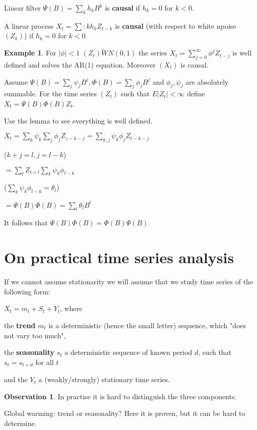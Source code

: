 \documentclass[12pt,a4paper]{amsart}
\theoremstyle{definition} %
\newtheorem{example}[defn]{Example}
\newtheorem{observation}[defn]{Observation}
\theoremstyle{plain} %
\begin{document}
Linear filter $\Psi(B) = \sum_k h_k B^k$ is {\bf causal} if $h_k = 0$ for $k < 0$. 

A linear process $X_t = \sum:k h_k Z_{t-k}$ is {\bf causal} (with respect to white npoise $(Z_k)$) if $h_k = 0$ for $k < 0$. 

\begin{example}
For $|\phi| < 1$ $(Z_t) \tilde WN(0,1)$ the series $X_t = \sum_{j=0}^\infty \phi^j Z_{t-j}$ is well defined and solves the AR(1) equation. Moreover $(X_t)$ is causal. 
\end{example}

Assume 
$\Psi(B) = \sum_j \psi_j B^j, \Phi(B) = \sum_j \phi_j B^j$ and $\phi_j, \psi_j$ are absolutely summable. For the time series $(Z_t)$ such that $E|Z_t| < \infty$ define $X_t = \Psi(B) \Phi(B) Z_t$.

Use the lemma 
to see everything is well defined. 

$X_t = \sum_k \psi_k \sum_j \phi_j Z_{z-k-j} = \sum_{k,j} \psi_k \phi_j Z_{t-k-j}$

($k+j = l, j = l-k$)

$= \sum_l Z_{t+l} \sum_k \psi_k \phi_{l-k}$

($\sum_k \psi_k \phi_{l-k} = \theta_l$)

$= \Psi(B) 
\Phi(B) = \sum_l \theta_l B^l$

It follows that 
$\Psi(B) 
\Phi(B) = \Phi(B)
\Psi(B)$


\section{On practical time series analysis}
\vskip1cm


If we cannot assume stationarity we will assume that we study time series of the following form:

$X_t = m_t + S_t + Y_t$, where 

the {\bf trend} $m_t$ is a deterministic (hence the small letter) sequence, which "does not vary too much",

the {\bf seasonality} $s_t$ a deterministic sequence of known period $d$, such that $s_t = s_{t+d}$ for all $t$

and the $Y_t$ a (weakly/strongly) stationary time series.


\begin{observation}
In practise it is hard to distinguish the three components. 

Global warming: trend or seasonality? Here it is proven, but it can be hard to determine.
\end{observation}
\end{document}
